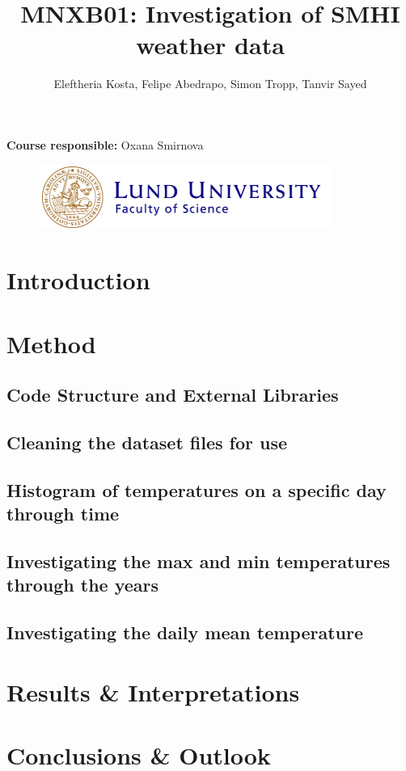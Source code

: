 \documentclass[12pt]{article}
\title{MNXB01: Investigation of SMHI weather data}
\author{Eleftheria Kosta, Felipe Abedrapo, Simon Tropp, Tanvir Sayed}
\affil[1]{The Faculty of Science, Department of Physics, Lund University}
\begin{document}
    \clearpage
    \maketitle
    \thispagestyle{empty}
    \vspace*{\fill}
    \begin{flushleft}
        \textbf{Course responsible:} Oxana Smirnova\\
    \end{flushleft}
    
    \begin{figure}[H]
        \centering
        \includegraphics[scale=1.1]{Images/Lund logo science1.png}
    \end{figure}
    
    \newpage

\section{Introduction}


\newpage
\section{Method}
\subsection{Code Structure and External Libraries}


\subsection{Cleaning the dataset files for use}


\subsection{Histogram of temperatures on a specific day through time}



\subsection{Investigating the max and min temperatures through the years}



\subsection{Investigating the daily mean temperature}


\newpage
\section{Results \& Interpretations}



\section{Conclusions \& Outlook}

\end{document}
